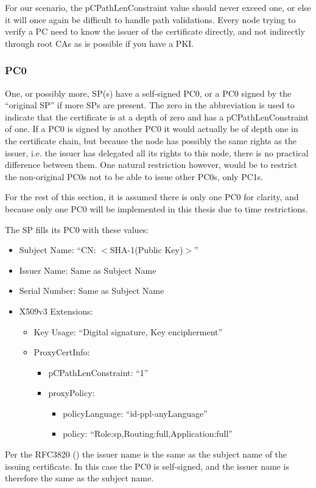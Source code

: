 For our scenario, the pCPathLenConstraint value should never exceed one, or else
it will once again be difficult to handle path validations. Every node trying to
verify a \ac{PC} need to know the issuer of the certificate directly, and not
indirectly through root \acp{CA} as is possible if you have a \ac{PKI}.

\subsubsection*{\acf{PC0}}
One, or possibly more, \ac{SP}(s) have a self-signed \ac{PC0}, or a \ac{PC0}
signed by the ``original \ac{SP}'' if more \acp{SP} are present. The zero in the
abbreviation is used to indicate that the certificate is at a depth of zero and
has a pCPathLenConstraint of one. If a \ac{PC0} is signed by another \ac{PC0}
it would actually be of depth one in the certificate chain, but because the node
has possibly the same rights as the issuer, i.e. the issuer has delegated all
its rights to this node, there is no practical difference between them. One
natural restriction however, would be to restrict the non-original \acp{PC0}
not to be able to issue other \acp{PC0}, only \acp{PC1}.

For the rest of this section, it is assumed there is only one \ac{PC0} for
clarity, and because only one \ac{PC0} will be implemented in this thesis due to
time restrictions.

The \ac{SP} fills its \ac{PC0} with these values:
\begin{itemize}
  \item Subject Name: ``CN: $<$SHA-1(Public Key)$>$''
  \item Issuer Name: Same as Subject Name
  \item Serial Number: Same as Subject Name
  \item X509v3 Extensions:
  \begin{itemize}
    \item Key Usage: ``Digital signature, Key encipherment''
    \item ProxyCertInfo:
    \begin{itemize}
      \item pCPathLenConstraint: ``1''
      \item proxyPolicy: 
      \begin{itemize}
        \item policyLanguage: ``id-ppl-anyLanguage''
        \item policy: ``Role:sp,Routing:full,Application:full''
      \end{itemize}
    \end{itemize}
  \end{itemize}
\end{itemize}
Per the RFC3820 (\cite{rfc3820}) the issuer name is the same as the subject name
of the issuing certificate. In this case the \ac{PC0} is self-signed, and the
issuer name is therefore the same as the subject name. 

